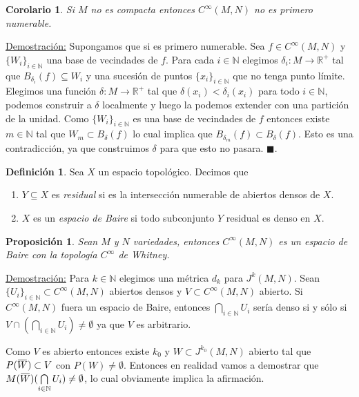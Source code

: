 \documentclass{report}
\newtheorem{prop}[theorem]{Proposici\'on}
\newtheorem{coro}[theorem]{Corolario}
\theoremstyle{definition}
\newtheorem{defi}[theorem]{Definici\'on}
\newcommand{\overbar}[1]{\mkern 1.5mu\overline{\mkern-1.5mu#1\mkern-1.5mu}\mkern 1.5mu}
\begin{document}
\begin{coro}
Si $M$ no es compacta entonces $C^\infty (M,N)$ no es primero numerable.
\end{coro}
\underline{Demostraci\'on:} Supongamos que si es primero numerable. Sea $f \in C^\infty (M,N)$ y $\{ W_i \}_{i \in \mathbb{N}}$ una base de vecindades de $f$. Para cada $i \in \mathbb{N}$ elegimos $\delta_i: M \to \mathbb{R}^+$ tal que $B_{\delta_i} (f) \subseteq W_i$ y una sucesi\'on de puntos $\{ x_i \}_{i \in \mathbb{N}}$ que no tenga punto l\'imite. Elegimos una funci\'on $\delta: M \to \mathbb{R}^+$ tal que $\delta (x_i) < \delta_i (x_i)$ para todo $i \in \mathbb{N}$, podemos construir a $\delta$ localmente y luego la podemos extender con una partici\'on de la unidad. Como $\{ W_i \}_{i \in \mathbb{N}}$ es una base de vecindades de $f$ entonces existe $m \in \mathbb{N}$ tal que $W_m \subset B_\delta (f)$ lo cual implica que $B_{\delta_m} (f) \subset B_\delta(f)$. Esto es una contradicci\'on, ya que construimos $\delta$ para que esto no pasara. $\blacksquare$.

\begin{defi}
Sea $X$ un espacio topol\'ogico. Decimos que
\begin{enumerate}
\item $Y \subseteq X$ es \textit{residual} si es la intersecci\'on numerable de abiertos densos de $X$.
\item $X$ es un \textit{espacio de Baire} si todo subconjunto $Y$  residual es denso en $X$.
\end{enumerate}

\end{defi}

\begin{prop}
Sean $M$ y $N$ variedades, entonces $C^\infty(M,N)$ es un espacio de Baire con la topolog\'ia $C^\infty$ de Whitney.
\end{prop}
\underline{Demostraci\'on:} Para $k \in \mathbb{N}$ elegimos una m\'etrica $d_k$ para $J^k (M , N)$. Sean $\{ U_i \}_{i \in \mathbb{N}} \subset C^\infty(M,N)$ abiertos densos y $V \subset C^\infty (M,N)$ abierto. Si $C^\infty (M, N) $ fuera un espacio de Baire, entonces $\bigcap\limits_{i \in \mathbb{N}} U_i$ ser\'ia denso si y s\'olo si $V \cap   \left(\bigcap\limits_{i \in \mathbb{N}} U_i \right) \neq \emptyset$ ya que $V$ es arbitrario.

Como $V$ es abierto entonces existe $k_0$ y $W \subset J^{k_0} (M, N)$ abierto tal que $P (\overbar{W}) \subset V$ con $P(W) \neq \emptyset$. Entonces en realidad vamos a demostrar que $M(\overbar{W}) (\bigcap\limits_{i \in \mathbb{N}} U_i ) \neq \emptyset$, lo cual obviamente implica la afirmaci\'on.
\end{document}
